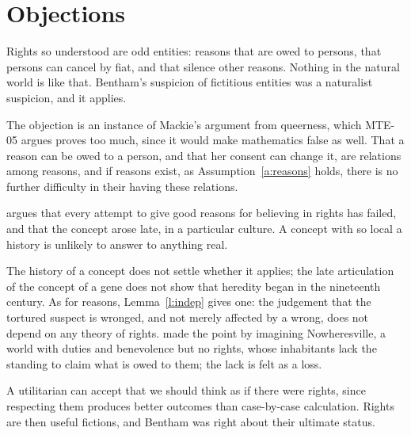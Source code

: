\documentclass{situationist-preprint}
\begin{document}
\section{Objections}

\begin{objection}[Queerness]
Rights so understood are odd entities: reasons that are owed to persons, that persons can cancel by fiat, and that silence other reasons. Nothing in the natural world is like that. Bentham's suspicion of fictitious entities was a naturalist suspicion, and it applies.
\end{objection}

\begin{reply}
The objection is an instance of Mackie's argument from queerness, which MTE-05 argues proves too much, since it would make mathematics false as well. That a reason can be owed to a person, and that her consent can change it, are relations among reasons, and if reasons exist, as Assumption~\ref{a:reasons} holds, there is no further difficulty in their having these relations.
\end{reply}

\begin{objection}
\citet[ch.~6]{MacIntyre1981} argues that every attempt to give good reasons for believing in rights has failed, and that the concept arose late, in a particular culture. A concept with so local a history is unlikely to answer to anything real.
\end{objection}

\begin{reply}
The history of a concept does not settle whether it applies; the late articulation of the concept of a gene does not show that heredity began in the nineteenth century. As for reasons, Lemma~\ref{l:indep} gives one: the judgement that the tortured suspect is wronged, and not merely affected by a wrong, does not depend on any theory of rights. \citet{Feinberg1970} made the point by imagining Nowheresville, a world with duties and benevolence but no rights, whose inhabitants lack the standing to claim what is owed to them; the lack is felt as a loss.
\end{reply}

\begin{objection}
A utilitarian can accept that we should think as if there were rights, since respecting them produces better outcomes than case-by-case calculation. Rights are then useful fictions, and Bentham was right about their ultimate status.
\end{objection}
\end{document}
